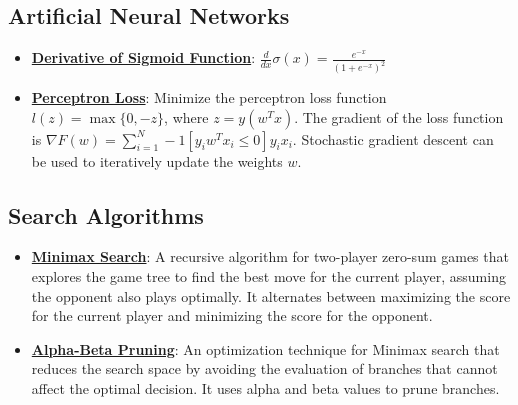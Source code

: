 \documentclass{article}%
\begin{document}
\subsection{Artificial Neural Networks}%
\label{subsec:ArtificialNeuralNetworks}%
\begin{itemize}[leftmargin=*]%
\item \href{\url{https://purdue.brightspace.com/d2l/common/assets/pdfjs-d2l-dist/1.0.14-legacy/web/viewer.html?file=\%252Fcontent\%252Fenforced\%252F1095467-wl.202510.CS.24300.001\%252F04L1-Linear\%20Algebra\%20Primer.pdf\%253Fou\%253D1095467\&lang=en-us\&container=d2l-fileviewer-rendered-pdf\&fullscreen=d2l-fileviewer-rendered-pdf-dialog\&height=667}#page=21}{\textbf{Derivative of Sigmoid Function}}: $\frac{d}{dx} \sigma(x) = \frac{e^{-x}}{(1 + e^{-x})^2}$%
\item \href{\url{https://purdue.brightspace.com/d2l/common/assets/pdfjs-d2l-dist/1.0.14-legacy/web/viewer.html?file=\%252Fcontent\%252Fenforced\%252F1095467-wl.202510.CS.24300.001\%252F05L2-ML\%20Basics.pdf\%253Fou\%253D1095467\&lang=en-us\&container=d2l-fileviewer-rendered-pdf\&fullscreen=d2l-fileviewer-rendered-pdf-dialog\&height=667}#page=27}{\textbf{Perceptron Loss}}: Minimize the perceptron loss function $l(z) = \max\{0, -z\}$, where $z = y(w^Tx)$. The gradient of the loss function is $\nabla F(w) = \sum_{i=1}^{N} -1[y_iw^Tx_i \le 0]y_ix_i$. Stochastic gradient descent can be used to iteratively update the weights $w$.%
\end{itemize}

%
\subsection{Search Algorithms}%
\label{subsec:SearchAlgorithms}%
\begin{itemize}[leftmargin=*]%
\item \href{\url{https://purdue.brightspace.com/d2l/common/assets/pdfjs-d2l-dist/1.0.14-legacy/web/viewer.html?file=\%252Fcontent\%252Fenforced\%252F1095467-wl.202510.CS.24300.001\%252F02L2-Intro.pdf\%253Fou\%253D1095467\&lang=en-us\&container=d2l-fileviewer-rendered-pdf\&fullscreen=d2l-fileviewer-rendered-pdf-dialog\&height=667}#page=22}{\textbf{Minimax Search}}: A recursive algorithm for two-player zero-sum games that explores the game tree to find the best move for the current player, assuming the opponent also plays optimally. It alternates between maximizing the score for the current player and minimizing the score for the opponent.%
\item \href{\url{https://purdue.brightspace.com/d2l/common/assets/pdfjs-d2l-dist/1.0.14-legacy/web/viewer.html?file=\%252Fcontent\%252Fenforced\%252F1095467-wl.202510.CS.24300.001\%252F02L2-Intro.pdf\%253Fou\%253D1095467\&lang=en-us\&container=d2l-fileviewer-rendered-pdf\&fullscreen=d2l-fileviewer-rendered-pdf-dialog\&height=667}#page=23}{\textbf{Alpha-Beta Pruning}}: An optimization technique for Minimax search that reduces the search space by avoiding the evaluation of branches that cannot affect the optimal decision. It uses alpha and beta values to prune branches.%
\end{itemize}

%
\end{document}
